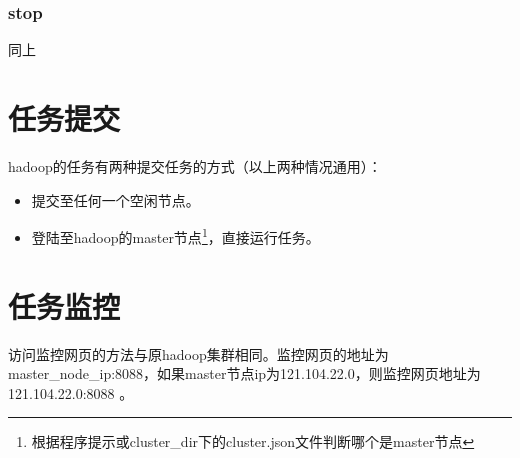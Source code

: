 \documentclass[UTF8,10pt,a4paper]{ctexart}
\begin{document}
\subsubsection{stop}
同上


\section{任务提交}
hadoop的任务有两种提交任务的方式（以上两种情况通用）：
\begin{itemize}
\item 提交至任何一个空闲节点。
\item 登陆至hadoop的master节点\footnote{根据程序提示或cluster\_dir下的cluster.json文件判断哪个是master节点}，直接运行任务。
\end{itemize}

\section{任务监控}
访问监控网页的方法与原hadoop集群相同。监控网页的地址为master\_node\_ip:8088，如果master节点ip为121.104.22.0，则监控网页地址为121.104.22.0:8088 。
\end{document}
